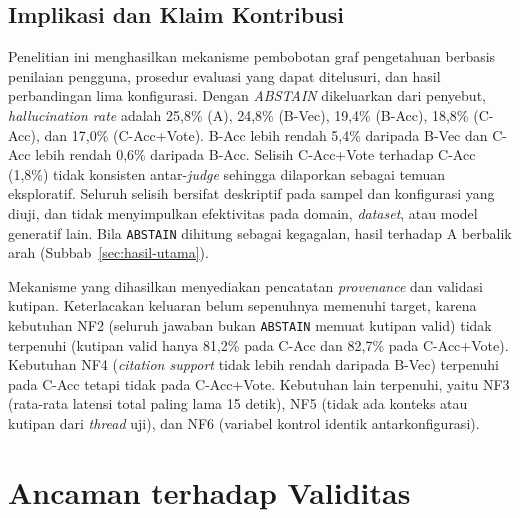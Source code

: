 \subsection{Implikasi dan Klaim Kontribusi}
\label{subsec:pembahasan-implikasi}

Penelitian ini menghasilkan mekanisme pembobotan graf pengetahuan berbasis penilaian pengguna, prosedur evaluasi yang dapat ditelusuri, dan hasil perbandingan lima konfigurasi. Dengan \emph{ABSTAIN} dikeluarkan dari penyebut, \emph{hallucination rate} adalah 25,8\% (A), 24,8\% (B-Vec), 19,4\% (B-Acc), 18,8\% (C-Acc), dan 17,0\% (C-Acc+Vote). B-Acc lebih rendah 5,4\% daripada B-Vec dan C-Acc lebih rendah 0,6\% daripada B-Acc. Selisih C-Acc+Vote terhadap C-Acc (1,8\%) tidak konsisten antar-\emph{judge} sehingga dilaporkan sebagai temuan eksploratif. Seluruh selisih bersifat deskriptif pada sampel dan konfigurasi yang diuji, dan tidak menyimpulkan efektivitas pada domain, \emph{dataset}, atau model generatif lain. Bila \texttt{ABSTAIN} dihitung sebagai kegagalan, hasil terhadap A berbalik arah (Subbab~\ref{sec:hasil-utama}).

Mekanisme yang dihasilkan menyediakan pencatatan \emph{provenance} dan validasi kutipan. Keterlacakan keluaran belum sepenuhnya memenuhi target, karena kebutuhan NF2 (seluruh jawaban bukan \texttt{ABSTAIN} memuat kutipan valid) tidak terpenuhi (kutipan valid hanya 81,2\% pada C-Acc dan 82,7\% pada C-Acc+Vote). Kebutuhan NF4 (\emph{citation support} tidak lebih rendah daripada B-Vec) terpenuhi pada C-Acc tetapi tidak pada C-Acc+Vote. Kebutuhan lain terpenuhi, yaitu NF3 (rata-rata latensi total paling lama 15 detik), NF5 (tidak ada konteks atau kutipan dari \emph{thread} uji), dan NF6 (variabel kontrol identik antarkonfigurasi).

\section{Ancaman terhadap Validitas}
\label{sec:validitas}

